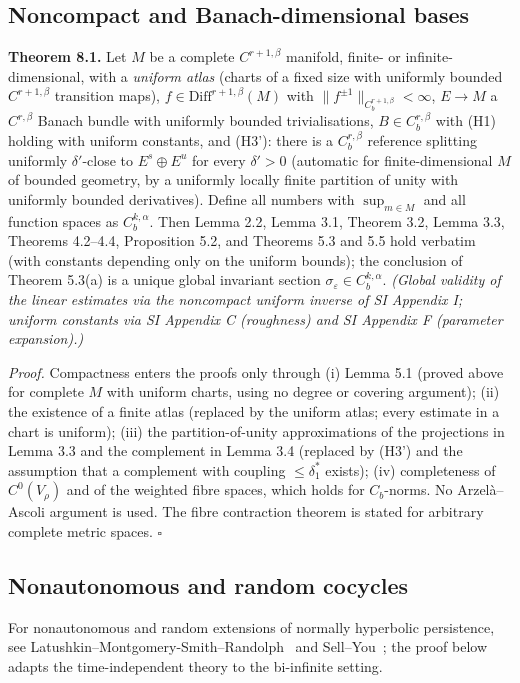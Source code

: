 \documentclass[11pt,a4paper]{article}
\theoremstyle{plain}
\theoremstyle{definition}
\theoremstyle{remark}
\numberwithin{equation}{section}
\numberwithin{figure}{section}
\begin{document}
\subsection{Noncompact and Banach-dimensional bases}

\textbf{Theorem 8.1.} Let $M$ be a complete $C^{r+1,\beta}$ manifold, finite- or infinite-dimensional, with a \textit{uniform atlas} (charts of a fixed size with uniformly bounded $C^{r+1,\beta}$ transition maps), $f\in\mathrm{Diff}^{r+1,\beta}(M)$ with $\|f^{\pm1}\|_{C^{r+1,\beta}_b}<\infty$, $E\to M$ a $C^{r,\beta}$ Banach bundle with uniformly bounded trivialisations, $B\in C^{r,\beta}_b$ with (H1) holding with uniform constants, and (H3'): there is a $C^{r,\beta}_b$ reference splitting uniformly $\delta'$-close to $E^s\oplus E^u$ for every $\delta'>0$ (automatic for finite-dimensional $M$ of bounded geometry, by a uniformly locally finite partition of unity with uniformly bounded derivatives). Define all numbers with $\sup_{m\in M}$ and all function spaces as $C^{k,\alpha}_b$. Then Lemma 2.2, Lemma 3.1, Theorem 3.2, Lemma 3.3, Theorems 4.2–4.4, Proposition 5.2, and Theorems 5.3 and 5.5 hold verbatim (with constants depending only on the uniform bounds); the conclusion of Theorem 5.3(a) is a unique global invariant section $\sigma_\varepsilon\in C^{k,\alpha}_b$. \textit{(Global validity of the linear estimates via the noncompact uniform inverse of SI Appendix I; uniform constants via SI Appendix C (roughness) and SI Appendix F (parameter expansion).)}

\textit{Proof.} Compactness enters the proofs only through (i) Lemma 5.1 (proved above for complete $M$ with uniform charts, using no degree or covering argument); (ii) the existence of a finite atlas (replaced by the uniform atlas; every estimate in a chart is uniform); (iii) the partition-of-unity approximations of the projections in Lemma 3.3 and the complement in Lemma 3.4 (replaced by (H3') and the assumption that a complement with coupling $\le\delta_1^*$ exists); (iv) completeness of $C^0(V_\rho)$ and of the weighted fibre spaces, which holds for $C_b$-norms. No Arzelà–Ascoli argument is used. The fibre contraction theorem is stated for arbitrary complete metric spaces. $\square$

\subsection{Nonautonomous and random cocycles}

For nonautonomous and random extensions of normally hyperbolic persistence, see Latushkin–Montgomery-Smith–Randolph~\cite{lat1996} and Sell–You~\cite{sell2002}; the proof below adapts the time-independent theory to the bi-infinite setting.
\end{document}

